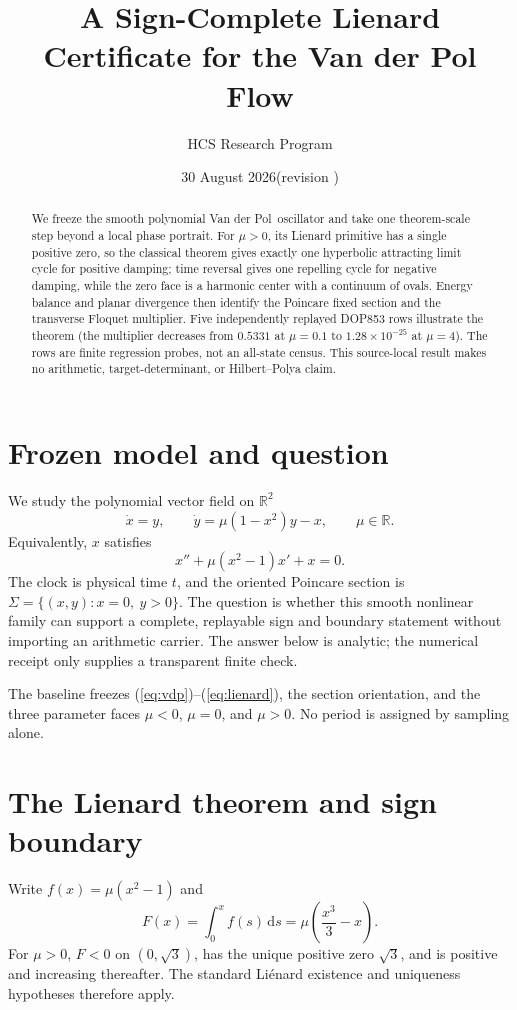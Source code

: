 \documentclass[10pt]{article}
\title{A Sign-Complete Lienard Certificate for the Van der Pol Flow}
\author{HCS Research Program}
\date{30 August 2026\quad (revision \CRevisionRound)}
\newcommand{\dd}{\,\mathrm d}
\newcommand{\R}{\mathbb R}
\newcommand{\VdP}{Van der Pol}
\begin{document}
\maketitle
\begin{abstract}
We freeze the smooth polynomial \VdP\ oscillator and take one theorem-scale
step beyond a local phase portrait.  For $\mu>0$, its Lienard primitive has a single
positive zero, so the classical theorem gives exactly one hyperbolic attracting
limit cycle for positive damping; time reversal gives one repelling cycle for
negative damping, while the zero face is a harmonic center with a continuum
of ovals.  Energy balance and planar divergence then identify the Poincare
fixed section and the transverse Floquet multiplier.  Five independently
replayed DOP853 rows illustrate the theorem (the multiplier decreases from
\(0.5331\) at \(\mu=0.1\) to \(1.28\times10^{-25}\) at \(\mu=4\)).
The rows are finite regression probes, not an all-state census.  This
source-local result makes no arithmetic, target-determinant, or
Hilbert--Polya claim.
\end{abstract}

\section{Frozen model and question}
We study the polynomial vector field on \(\R^2\)
\begin{equation}
 \dot x=y,\qquad \dot y=\mu(1-x^2)y-x,\qquad \mu\in\R .
 \label{eq:vdp}
\end{equation}
Equivalently, \(x\) satisfies
\begin{equation}
 x''+\mu(x^2-1)x'+x=0 .
 \label{eq:lienard}
\end{equation}
The clock is physical time \(t\), and the oriented Poincare section is
\(\Sigma=\{(x,y):x=0,\ y>0\}\).  The question is whether this smooth
nonlinear family can support a complete, replayable sign and boundary
statement without importing an arithmetic carrier.  The answer below is
analytic; the numerical receipt only supplies a transparent finite check.

\ifnum{}
The baseline freezes (\ref{eq:vdp})--(\ref{eq:lienard}), the section
orientation, and the three parameter faces \(\mu<0\), \(\mu=0\), and
\(\mu>0\).  No period is assigned by sampling alone.
\fi

\section{The Lienard theorem and sign boundary}
Write \(f(x)=\mu(x^2-1)\) and
\begin{equation}
 F(x)=\int_0^x f(s)\dd s=\mu\left(\frac{x^3}{3}-x\right).
 \label{eq:F}
\end{equation}
For \(\mu>0\), \(F<0\) on \((0,\sqrt3)\), has the unique positive zero
\(\sqrt3\), and is positive and increasing thereafter.  The standard
Liénard existence and uniqueness hypotheses therefore apply.
\end{document}
